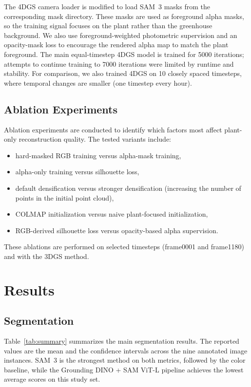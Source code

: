 \documentclass[sigconf]{acmart}
\begin{document}
The 4DGS camera loader is modified to load SAM~3 masks from the corresponding mask directory. These masks are used as foreground alpha masks, so the training signal focuses on the plant rather than the greenhouse background. We also use foreground-weighted photometric supervision and an opacity-mask loss to encourage the rendered alpha map to match the plant foreground. The main equal-timestep 4DGS model is trained for 5000 iterations; attempts to continue training to 7000 iterations were limited by runtime and stability. For comparison, we also trained 4DGS on 10 closely spaced timesteps, where temporal changes are smaller (one timestep every hour).

\subsection{Ablation Experiments}
Ablation experiments are conducted to identify which factors most affect plant-only reconstruction quality. The tested variants include:
\begin{itemize}
    \item hard-masked RGB training versus alpha-mask training,
    \item alpha-only training versus silhouette loss,
    \item default densification versus stronger densification (increasing the number of points in the initial point cloud),
    \item COLMAP initialization versus naive plant-focused initialization,
    \item RGB-derived silhouette loss versus opacity-based alpha supervision.
\end{itemize}

These ablations are performed on selected timesteps (frame0001 and frame1180) and with the 3DGS method. 


\section{Results}
\subsection{Segmentation}
Table~\ref{tab:summary} summarizes the main segmentation results. The reported values are the mean and the confidence intervals across the nine annotated image instances. SAM~3 is the strongest method on both metrics, followed by the color baseline, while the Grounding DINO + SAM ViT-L pipeline achieves the lowest average scores on this study set.
\end{document}
